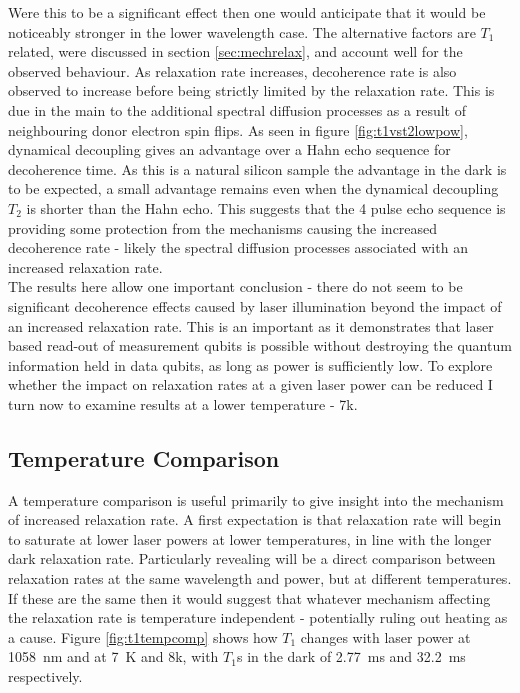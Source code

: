 Were this to be a significant effect then one would anticipate that it would be noticeably stronger in the lower wavelength case.
The alternative factors are $T_1$ related, were discussed in section \ref{sec:mechrelax}, and account well for the observed behaviour.
As relaxation rate increases, decoherence rate is also observed to increase before being strictly limited by the relaxation rate.
This is due in the main to the additional spectral diffusion processes as a result of neighbouring donor electron spin flips.
As seen in figure \ref{fig:t1vst2lowpow}, dynamical decoupling gives an advantage over a Hahn echo sequence for decoherence time.
As this is a natural silicon sample the advantage in the dark is to be expected, a small advantage remains even when the dynamical decoupling $T_2$ is shorter than the Hahn echo.
This suggests that the 4 pulse echo sequence is providing some protection from the mechanisms causing the increased decoherence rate - likely the spectral diffusion processes associated with an increased relaxation rate.
\\
The results here allow one important conclusion - there do not seem to be significant decoherence effects caused by laser illumination beyond the impact of an increased relaxation rate.
This is an important as it demonstrates that laser based read-out of measurement qubits is possible without destroying the quantum information held in data qubits, as long as power is sufficiently low.
To explore whether the impact on relaxation rates at a given laser power can be reduced I turn now to examine results at a lower temperature - 7k.

\subsection{Temperature Comparison}

A temperature comparison is useful primarily to give insight into the mechanism of increased relaxation rate.
A first expectation is that relaxation rate will begin to saturate at lower laser powers at lower temperatures, in line with the longer dark relaxation rate.
Particularly revealing will be a direct comparison between relaxation rates at the same wavelength and power, but at different temperatures.
If these are the same then it would suggest that whatever mechanism affecting the relaxation rate is temperature independent - potentially ruling out heating as a cause.
Figure \ref{fig:t1tempcomp} shows how $T_1$ changes with laser power at 1058~nm and at 7~K and 8k, with $T_1$s in the dark of 2.77~ms and 32.2~ms respectively.

